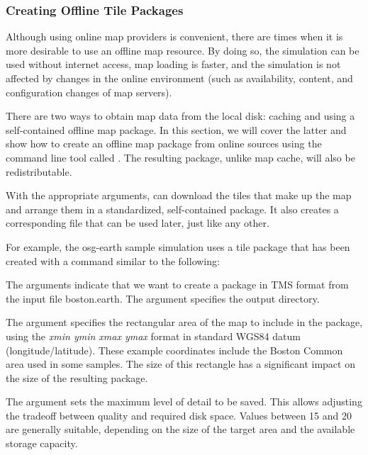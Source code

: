 \subsubsection{Creating Offline Tile Packages}
\label{sec:graphics:offline-tiles}

Although using online map providers is convenient, there are times when it is
more desirable to use an offline map resource. By doing so, the simulation can
be used without internet access, map loading is faster, and the simulation is
not affected by changes in the online environment (such as availability,
content, and configuration changes of map servers).

There are two ways to obtain map data from the local disk: caching and using a
self-contained offline map package. In this section, we will cover the latter
and show how to create an offline map package from online sources using the
command line tool called . The resulting package,
unlike map cache, will also be redistributable.

With the appropriate arguments,  can download the tiles
that make up the map and arrange them in a standardized, self-contained package.
It also creates a corresponding  file that can be used later, just like
any other.

For example, the osg-earth sample simulation uses a tile package that has been
created with a command similar to the following:


The  arguments indicate that we want to create a
package in TMS format from the input file boston.earth. The \ttt{-{}-out
offline-tiles} argument specifies the output directory.

The  argument specifies the rectangular area of the map to
include in the package, using the \textit{xmin ymin xmax ymax} format in
standard WGS84 datum (longitude/latitude). These example coordinates include the
Boston Common area used in some samples. The size of this rectangle has a
significant impact on the size of the resulting package.

The  argument sets the maximum level of detail to be
saved. This allows adjusting the tradeoff between quality and required disk
space. Values between 15 and 20 are generally suitable, depending on the size of
the target area and the available storage capacity.

